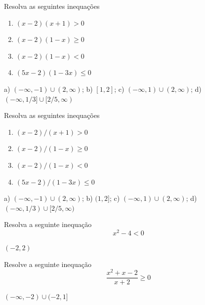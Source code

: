 \begin{exer}
  Resolva as seguintes inequações
  \begin{enumerate}
  \item $(x-2)(x+1) > 0$
  \item $(x-2)(1-x) \geq 0$
  \item $(x-2)(1-x) < 0$
  \item $(5x-2)(1-3x) \leq 0$
  \end{enumerate}
\end{exer}
\begin{resp}
  a) $(-\infty,-1)\cup (2,\infty)$; b) $[1,2]$; c) $(-\infty,1)\cup (2,\infty)$; d) $(-\infty,1/3]\cup [2/5,\infty)$
\end{resp}

\begin{exer}
  Resolva as seguintes inequações
  \begin{enumerate}
  \item $(x-2)/(x+1) > 0$
  \item $(x-2)/(1-x) \geq 0$
  \item $(x-2)/(1-x) < 0$
  \item $(5x-2)/(1-3x) \leq 0$
  \end{enumerate}
\end{exer}
\begin{resp}
  a) $(-\infty,-1)\cup (2,\infty)$; b) $(1,2]$; c) $(-\infty,1)\cup (2,\infty)$; d) $(-\infty,1/3)\cup [2/5,\infty)$
\end{resp}

\begin{exer}
  Resolva a seguinte inequação
  \begin{equation}
    x^2 - 4 < 0
  \end{equation}
\end{exer}
\begin{resp}
  $(-2,2)$
\end{resp}

\begin{exer}
  Resolve a seguinte inequação
  \begin{equation}
    \frac{x^2 + x - 2}{x+2} \geq 0
  \end{equation}
\end{exer}
\begin{resp}
  $(-\infty, -2)\cup (-2, 1]$
\end{resp}